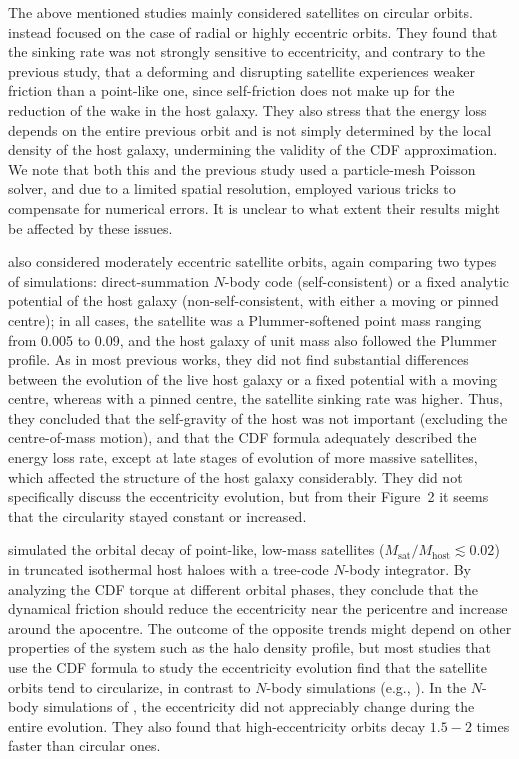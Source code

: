 \documentclass[twocolumn]{aastex63}
\begin{document}
The above mentioned studies mainly considered satellites on circular orbits. \citet{Seguin1996} instead focused on the case of radial or highly eccentric orbits. They found that the sinking rate was not strongly sensitive to eccentricity, and contrary to the previous study, that a deforming and disrupting satellite experiences weaker friction than a point-like one, since self-friction does not make up for the reduction of the wake in the host galaxy. They also stress that the energy loss depends on the entire previous orbit and is not simply determined by the local density of the host galaxy, undermining the validity of the CDF approximation. We note that both this and the previous study used a particle-mesh Poisson solver, and due to a limited spatial resolution, employed various tricks to compensate for numerical errors. It is unclear to what extent their results might be affected by these issues.

\citet{Cora1997} also considered moderately eccentric satellite orbits, again comparing two types of simulations: direct-summation $N$-body code (self-consistent) or a fixed analytic potential of the host galaxy (non-self-consistent, with either a moving or pinned centre); in all cases, the satellite was a Plummer-softened point mass ranging from 0.005 to 0.09, and the host galaxy of unit mass also followed the Plummer profile. As in most previous works, they did not find substantial differences between the evolution of the live host galaxy or a fixed potential with a moving centre, whereas with a pinned centre, the satellite sinking rate was higher. Thus, they concluded that the self-gravity of the host was not important (excluding the centre-of-mass motion), and that the CDF formula adequately described the energy loss rate, except at late stages of evolution of more massive satellites, which affected the structure of the host galaxy considerably. They did not specifically discuss the eccentricity evolution, but from their Figure~2 it seems that the circularity stayed constant or increased.

\citet{vdBosch1999} simulated the orbital decay of point-like, low-mass satellites ($M_\mathrm{sat}/M_\mathrm{host}\lesssim 0.02$) in truncated isothermal host haloes with a tree-code $N$-body integrator. By analyzing the CDF torque at different orbital phases, they conclude that the dynamical friction should reduce the eccentricity near the pericentre and increase around the apocentre. The outcome of the opposite trends might depend on other properties of the system such as the halo density profile, but most studies that use the CDF formula to study the eccentricity evolution find that the satellite orbits tend to circularize, in contrast to $N$-body simulations (e.g., \citealt{Jiang2000,Nipoti2017}). In the $N$-body simulations of \citet{vdBosch1999}, the eccentricity did not appreciably change during the entire evolution. They also found that high-eccentricity orbits decay $1.5-2$ times faster than circular ones.
\end{document}
